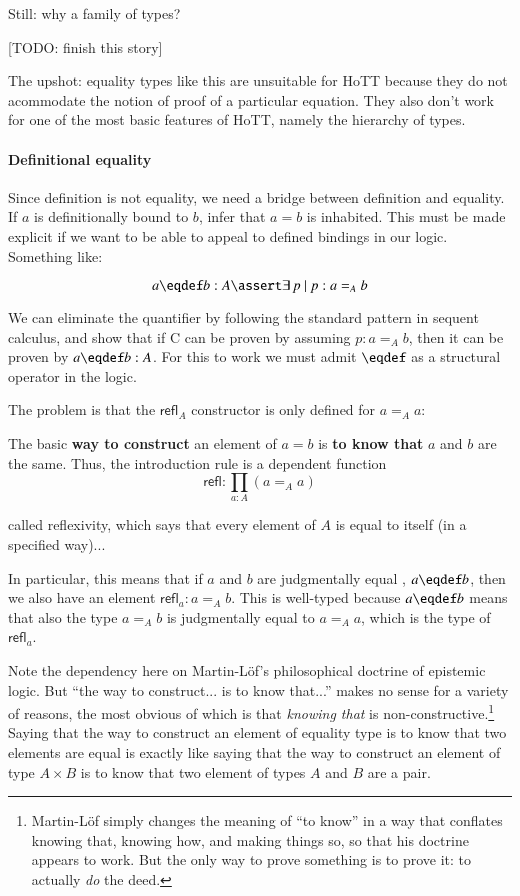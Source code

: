 Still: why a family of types?

[TODO: finish this story]

The upshot: equality types like this are unsuitable for HoTT because
they do not acommodate the notion of proof of a particular equation.
They also don't work for one of the most basic features of HoTT,
namely the hierarchy of types.

\paragraph{Definitional equality}

Since definition is not equality, we need a bridge between definition
and equality. If \(a\) is definitionally bound to \(b\), infer that
\(a=b\) is inhabited. This must be made explicit if we want to be able
to appeal to defined bindings in our logic. Something like:

\[a\defeq b:A \linfer\exists\,p\ |\ p : a=_A b\]

We can eliminate the quantifier by following the standard pattern in
sequent calculus, and show that if C can be proven by assuming
\(p:a=_A b\), then it can be proven by \(a\defeq b:A\). For this to
work we must admit \(\defeq\) as a structural operator in the logic.

The problem is that the
\(\textsf{refl}_A\) constructor is only defined for \(a=_A a\):

\begin{displayquote}
    The basic \textbf{way to construct} an element of \(a=b\) is
    \textbf{to know that} \(a\) and \(b\) are the same. Thus, the
    introduction rule is a dependent function
  \[\textsf{refl} : ∏_{a:A}(a=_A a)\]

  called reflexivity, which says that every element of \(A\) is equal
  to itself (in a specified way)...

  In particular, this means that if \(a\) and \(b\) are judgmentally
  equal {}, \(a\defeq b\), then we also
  have an element \(\textsf{refl}_a : a=_A b\). This is well-typed
  because \(a\defeq b\) means that also the type \(a=_A b\) is
  judgmentally equal {} to \(a=_A a\),
    which is the type of \(\textsf{refl}_a\).
\end{displayquote}

Note the dependency here on Martin-Löf's philosophical doctrine of
epistemic logic. But ``the way to construct... is to know that...''
makes no sense for a variety of reasons, the most obvious of which is
that \textit{knowing that} is non-constructive.\footnote{Martin-Löf
simply changes the meaning of ``to know'' in a way that conflates
knowing that, knowing how, and making things so, so that his doctrine
appears to work. But the only way to prove something is to prove it:
to actually \textit{do} the deed.} Saying that the way to construct an
element of equality type is to know that two elements are equal is
exactly like saying that the way to construct an element of type
\(A\times B\) is to know that two element of types \(A\) and \(B\) are
a pair.

